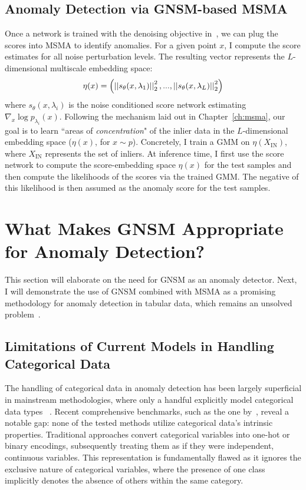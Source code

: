 \subsection*{Anomaly Detection via GNSM-based MSMA}
Once a network is trained with the denoising objective in~, we can plug the scores into MSMA to identify anomalies. For a given point $x$, I compute the score estimates for all noise perturbation levels. The resulting vector represents the $L$-dimensional multiscale embedding space:
\begin{equation}\label{eq:norms}
    \eta(x) = \left( \left|\left| {  s_\theta(x, \lambda_1) } \right|\right|_2^2, ... , \left|\left| {  s_\theta(x, \lambda_L) } \right|\right|_2^2 \right)
\end{equation}
where $s_\theta(x, \lambda_i)$ is the noise conditioned score network estimating $\nabla_{x} \log p_{\lambda_i}(x)$.
Following the mechanism laid out in Chapter~\ref{ch:msma}, our goal is to learn ``areas of \emph{concentration}" of the inlier data in the $L$-dimensional embedding space ($\eta(x)$, for $x\sim p$). Concretely, I train a GMM on $\eta(X_{\text{IN}})$, where $X_{\text{IN}}$ represents the set of inliers. At inference time, I first use the score network to compute the score-embedding space $\eta(x)$ for the test samples and then compute the likelihoods of the scores via the trained GMM. The negative of this likelihood is then assumed as the anomaly score for the test samples.

\section{What Makes GNSM Appropriate for Anomaly Detection?}
\label{sec:gumbel_ano}

This section will elaborate on the need for GNSM as an anomaly detector. Next, I will demonstrate the use of GNSM combined with MSMA as a promising methodology for anomaly detection in tabular data, which remains an unsolved problem~\cite{pang_deep_2021, ruff_unifying_2021, aggarwal_introduction_2017}.  

\subsection*{Limitations of Current Models in Handling Categorical Data}

The handling of categorical data in anomaly detection has been largely superficial in mainstream methodologies, where only a handful explicitly model categorical data types ~\cite{pang2021homophily}. Recent comprehensive benchmarks, such as the one by~\cite{han2022adbench}, reveal a notable gap: none of the tested methods utilize categorical data's intrinsic properties. Traditional approaches convert categorical variables into one-hot or binary encodings, subsequently treating them as if they were independent, continuous variables. This representation is fundamentally flawed as it ignores the exclusive nature of categorical variables, where the presence of one class implicitly denotes the absence of others within the same category.

